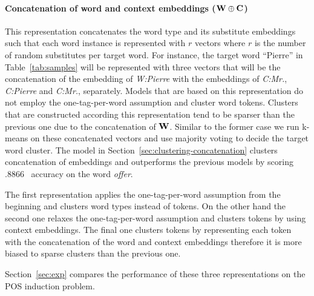 \paragraph{Concatenation of word and context embeddings (${\bf W\oplus
    C}$)}
This representation concatenates the word type and its substitute
embeddings such that each word instance is represented with $r$
vectors where $r$ is the number of random substitutes per target word.
For instance, the target word ``Pierre'' in Table~\ref{tab:samples}
will be represented with three vectors that will be the concatenation
of the embedding of {\it W:Pierre} with the embeddings of {\it C:Mr.},
{\it C:Pierre} and {\it C:Mr.}, separately.  Models that are based on
this representation do not employ the one-tag-per-word assumption and
cluster word tokens.  Clusters that are constructed according this
representation tend to be sparser than the previous one due to the
concatenation of ${\bf W}$.  Similar to the former case we run k-means
on these concatenated vectors and use majority voting to decide the
target word cluster.  The model in
Section~\ref{sec:clustering-concatenation} clusters concatenation of
embeddings and outperforms the previous models by scoring .8866 \mto\
accuracy on the word {\it offer}.

The first representation applies the one-tag-per-word assumption from
the beginning and clusters word types instead of tokens.  On the other
hand the second one relaxes the one-tag-per-word assumption and
clusters tokens by using context embeddings.  The final one clusters
tokens by representing each token with the concatenation of the word
and context embeddings therefore it is more biased to sparse clusters
than the previous one.

Section~\ref{sec:exp} compares the performance of these three
representations on the POS induction problem.
